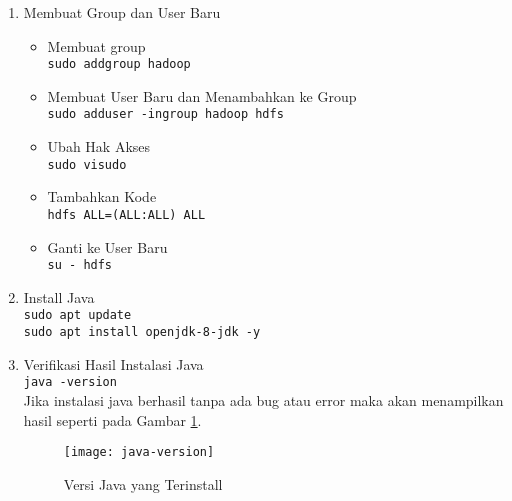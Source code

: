 \documentclass[a4paper]{tufte-handout}
\begin{document}
\begin{enumerate}
\item Membuat Group dan User Baru
\begin{itemize}
\item Membuat group \\
{\tt sudo addgroup hadoop}
\item Membuat User Baru dan Menambahkan ke Group \\
{\tt sudo adduser -ingroup hadoop hdfs}
\item Ubah Hak Akses \\
{\tt sudo visudo}
\item Tambahkan Kode \\
{\tt hdfs	ALL=(ALL:ALL) ALL}
\item Ganti ke User Baru \\
{\tt su - hdfs}
\end{itemize}

\item Install Java \\
{\tt sudo apt update} \\
{\tt sudo apt install openjdk-8-jdk -y} \\

\item Verifikasi Hasil Instalasi Java \\
{\tt java -version} \\
Jika instalasi java berhasil tanpa ada bug atau error maka akan menampilkan hasil seperti pada Gambar \ref{gam:java-version}.

\begin{figure}
\setlength{\belowcaptionskip}{-10pt}
\texttt{[image: java-version]}
\caption{Versi Java yang Terinstall}
\label{gam:java-version}
\end{figure}


\end{enumerate}
\end{document}
